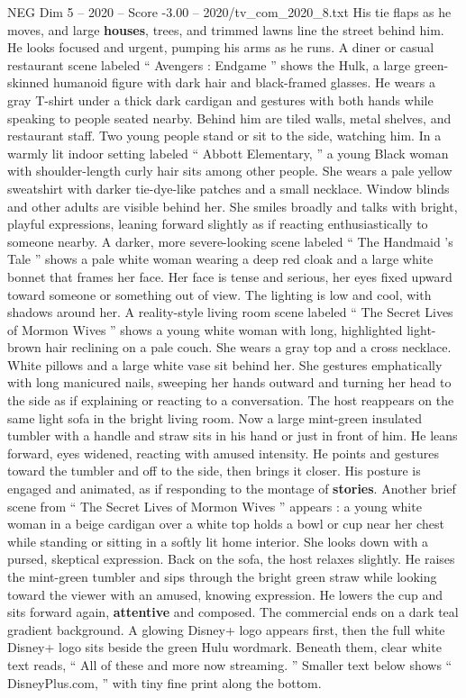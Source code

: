 \begin{textsample}{NEG Dim 5 – 2020 – Score -3.00 – 2020/tv\_com\_2020\_8.txt}
His tie flaps as he moves, and large \textbf{houses}, trees, and trimmed lawns line the street behind him.
He looks focused and urgent, pumping his arms as he runs.
A diner or casual restaurant scene labeled “ Avengers : Endgame ” shows the Hulk, a large green-skinned humanoid figure with dark hair and black-framed glasses.
He wears a gray T-shirt under a thick dark cardigan and gestures with both hands while speaking to people seated nearby.
Behind him are tiled walls, metal shelves, and restaurant staff.
Two young people stand or sit to the side, watching him.
In a warmly lit indoor setting labeled “ Abbott Elementary, ” a young Black woman with shoulder-length curly hair sits among other people.
She wears a pale yellow sweatshirt with darker tie-dye-like patches and a small necklace.
Window blinds and other adults are visible behind her.
She smiles broadly and talks with bright, playful expressions, leaning forward slightly as if reacting enthusiastically to someone nearby.
A darker, more severe-looking scene labeled “ The Handmaid ’s Tale ” shows a pale white woman wearing a deep red cloak and a large white bonnet that frames her face.
Her face is tense and serious, her eyes fixed upward toward someone or something out of view.
The lighting is low and cool, with shadows around her.
A reality-style living room scene labeled “ The Secret Lives of Mormon Wives ” shows a young white woman with long, highlighted light-brown hair reclining on a pale couch.
She wears a gray top and a cross necklace.
White pillows and a large white vase sit behind her.
She gestures emphatically with long manicured nails, sweeping her hands outward and turning her head to the side as if explaining or reacting to a conversation.
The host reappears on the same light sofa in the bright living room.
Now a large mint-green insulated tumbler with a handle and straw sits in his hand or just in front of him.
He leans forward, eyes widened, reacting with amused intensity.
He points and gestures toward the tumbler and off to the side, then brings it closer.
His posture is engaged and animated, as if responding to the montage of \textbf{stories}.
Another brief scene from “ The Secret Lives of Mormon Wives ” appears : a young white woman in a beige cardigan over a white top holds a bowl or cup near her chest while standing or sitting in a softly lit home interior.
She looks down with a pursed, skeptical expression.
Back on the sofa, the host relaxes slightly.
He raises the mint-green tumbler and sips through the bright green straw while looking toward the viewer with an amused, knowing expression.
He lowers the cup and sits forward again, \textbf{attentive} and composed.
The commercial ends on a dark teal gradient background.
A glowing Disney+ logo appears first, then the full white Disney+ logo sits beside the green Hulu wordmark.
Beneath them, clear white text reads, “ All of these and more now streaming. ” Smaller text below shows “ DisneyPlus.com, ” with tiny fine print along the bottom.

\end{textsample}
